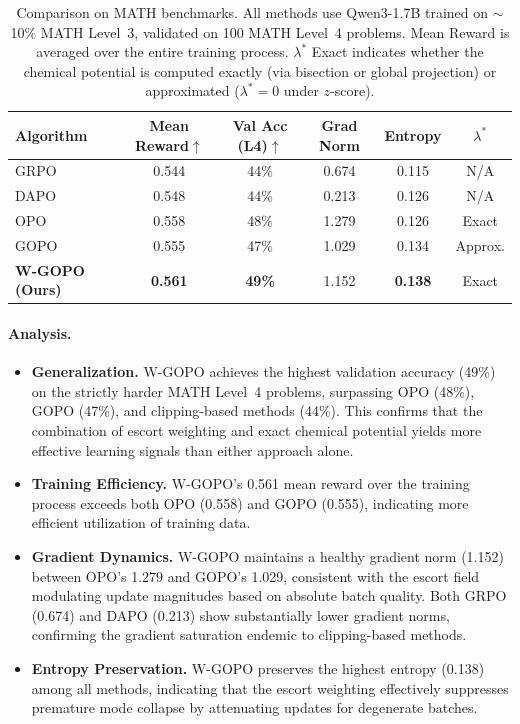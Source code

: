 \documentclass[11pt]{article}
\theoremstyle{definition}
\theoremstyle{remark}
\begin{document}
\begin{table}[htbp]
\centering
\caption{Comparison on MATH benchmarks. All methods use Qwen3-1.7B trained on $\sim$10\% MATH Level~3, validated on 100 MATH Level~4 problems. Mean Reward is averaged over the entire training process. $\lambda^*$ Exact indicates whether the chemical potential is computed exactly (via bisection or global projection) or approximated ($\lambda^* = 0$ under $z$-score).}
\label{tab:results}
\begin{tabular}{lccccc}
\toprule
\textbf{Algorithm} & \textbf{Mean Reward}$\uparrow$ & \textbf{Val Acc (L4)}$\uparrow$ & \textbf{Grad Norm} & \textbf{Entropy} & \textbf{$\lambda^*$} \\
\midrule
GRPO & 0.544 & 44\% & 0.674 & 0.115 & N/A \\
DAPO & 0.548 & 44\% & 0.213 & 0.126 & N/A \\
OPO  & 0.558 & 48\% & 1.279 & 0.126 & Exact \\
GOPO & 0.555 & 47\% & 1.029 & 0.134 & Approx. \\
\textbf{W-GOPO (Ours)} & \textbf{0.561} & \textbf{49\%} & 1.152 & \textbf{0.138} & Exact \\
\bottomrule
\end{tabular}
\end{table}

\paragraph{Analysis.}
\begin{itemize}[leftmargin=2em]
    \item \textbf{Generalization.} W-GOPO achieves the highest validation accuracy (49\%) on the strictly harder MATH Level~4 problems, surpassing OPO (48\%), GOPO (47\%), and clipping-based methods (44\%). This confirms that the combination of escort weighting and exact chemical potential yields more effective learning signals than either approach alone.
    \item \textbf{Training Efficiency.} W-GOPO's 0.561 mean reward over the training process exceeds both OPO (0.558) and GOPO (0.555), indicating more efficient utilization of training data.
    \item \textbf{Gradient Dynamics.} W-GOPO maintains a healthy gradient norm (1.152) between OPO's 1.279 and GOPO's 1.029, consistent with the escort field modulating update magnitudes based on absolute batch quality. Both GRPO (0.674) and DAPO (0.213) show substantially lower gradient norms, confirming the gradient saturation endemic to clipping-based methods.
    \item \textbf{Entropy Preservation.} W-GOPO preserves the highest entropy (0.138) among all methods, indicating that the escort weighting effectively suppresses premature mode collapse by attenuating updates for degenerate batches.
\end{itemize}
\end{document}
